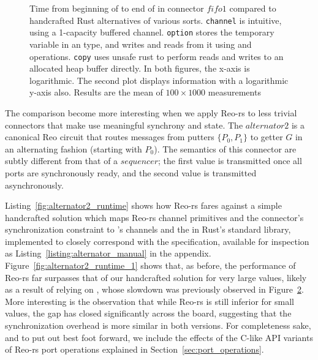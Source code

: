 \begin{figure}
{\begin{subfigure}[b]{0.63\textwidth}
			\caption{}
			\label{fig:exper_rtt_1}
		\end{subfigure}%
	}
	\caption[Performance of fifo1 connector vs.\ handcrafted Rust code.]{Time from beginning of  to end of  in connector $fifo1$ compared to handcrafted Rust alternatives of various sorts. \texttt{channel} is intuitive, using a  1-capacity buffered channel. \texttt{option} stores the temporary variable in an  type, and writes and reads from it using  and  operations. \texttt{copy} uses unsafe rust to perform reads and writes to an allocated heap buffer directly. In both figures, the x-axis is logarithmic. The second plot displays information with a logarithmic y-axis also. Results are the mean of $100\times{}1000$ measurements}
	\label{fig:exper_rtt}
\end{figure}

The comparison become more interesting when we apply Reo-rs to less trivial connectors that make use meaningful synchrony and state. The $alternator2$ is a canonical Reo circuit that routes messages from putters $\{P_0, P_1\}$ to getter $G$ in an alternating fashion (starting with $P_0$). The semantics of this connector are subtly different from that of a $sequencer$; the first value is transmitted once all ports are synchronously ready, and the second value is transmitted asynchronously.

Listing~\ref{fig:alternator2_runtime} shows how Reo-rs fares against a simple handcrafted solution which maps Reo-rs channel primitives and the connector's synchronization constraint to 's channels and the  in Rust's standard library, implemented to closely correspond with the specification, available for inspection as Listing~\ref{listing:alternator_manual} in the appendix. Figure~\ref{fig:alternator2_runtime_1} shows that, as before, the performance of Reo-rs far surpasses that of our handcrafted solution for very large values, likely as a result of relying on , whose slowdown was previously observed in Figure~\ref{fig:exper_rtt}. More interesting is the observation that while Reo-rs is still inferior for small values, the gap has closed significantly across the board, suggesting that the synchronization overhead is more similar in both versions. For completeness sake, and to put out best foot forward, we include the effects of the C-like  API variants of Reo-rs port operations explained in Section~\ref{sec:port_operations}.  

